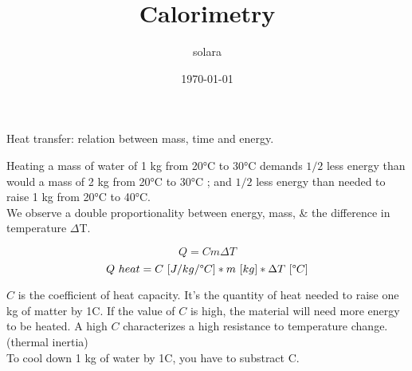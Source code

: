 \documentclass{article}
\title{Calorimetry}
\author{solara}
\date{\today}
\begin{document}
\maketitle

Heat transfer: relation between mass, time and energy.

\vspace{1cm}
Heating a mass of water of 1 kg from 20°C to 30°C demands $1/2$ less energy than would 
a mass of 2 kg from 20°C to 30°C ; and $1/2$ less energy than needed to raise 1 kg from 20°C to 40°C. \\
We observe a double proportionality between energy, mass, \& the difference in temperature $\Delta$T.

$$Q=Cm\Delta T$$
$$Q\ heat = C\ [J/kg/\degree C] * m\ [kg] * \Delta T\ [\degree C]$$
\vspace{0cm}

$C$ is the coefficient of heat capacity. It's the quantity of heat needed to raise one kg of matter by 1\degree C.
If the value of $C$ is high, the material will need more energy to be heated. A high $C$ characterizes a high
resistance to temperature change. (thermal inertia) \\
To cool down 1 kg of water by 1\degree C, you have to substract C.
\end{document}
